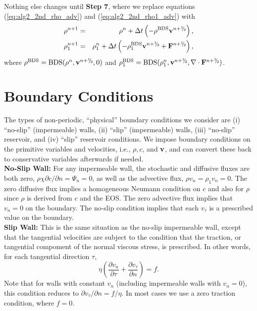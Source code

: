 \documentclass[final]{siamltex}
\newcommand{\sfrac}[2]{\mathchoice
  {\kern0em\raise.5ex\hbox{\the\scriptfont0 #1}\kern-.15em/
   \kern-.15em\lower.25ex\hbox{\the\scriptfont0 #2}}
  {\kern0em\raise.5ex\hbox{\the\scriptfont0 #1}\kern-.15em/
   \kern-.15em\lower.25ex\hbox{\the\scriptfont0 #2}}
  {\kern0em\raise.5ex\hbox{\the\scriptscriptfont0 #1}\kern-.2em/
   \kern-.15em\lower.25ex\hbox{\the\scriptscriptfont0 #2}}
  {#1\!/#2}}
\def\Fb {{\bf F}}
\def\vb {{\bf v}}
\def\myhalf {\sfrac{1}{2}}
\begin{document}
Nothing else changes until {\bf Step 7}, where we replace equations 
(\ref{eq:alg2_2nd_rho_adv}) and (\ref{eq:alg2_2nd_rho1_adv}) with
\begin{eqnarray}
\rho^{n+1} &=& \rho^n + \Delta t\left(-\rho^{\rm BDS}\vb^{n+\myhalf}\right),\\
\rho_1^{n+1} &=& \rho_1^n + \Delta t\left(-\rho_1^{\rm BDS}\vb^{n+\myhalf} + \Fb^{n+\myhalf}\right),
\end{eqnarray}
where $\rho^{\rm BDS} = {\rm BDS}(\rho^n,\vb^{n+\myhalf},0)$ and 
$\rho_1^{\rm BDS} = {\rm BDS}(\rho_1^n,\vb^{n+\myhalf},\nabla\cdot\Fb^{n+\myhalf})$.

\section{Boundary Conditions}
The types of non-periodic, ``physical'' boundary conditions we consider are 
(i) ``no-slip'' (impermeable) walls,
(ii) ``slip'' (impermeable) walls,
(iii) ``no-slip'' reservoir, and
(iv) ``slip'' reservoir conditions.
We impose boundary conditions on the primitive variables and velocities,
i.e., $\rho,c$, and $\vb$, and can convert these back to conservative
variables afterwards if needed.\\

{\bf No-Slip Wall:}  For any impermeable wall, the stochastic and diffusive
fluxes are both zero, $\rho\chi\partial c/\partial n = \Psi_n = 0$, as well as the 
advective flux, $\rho v_n = \rho_1 v_n = 0$.  The zero
diffusive flux implies a homogeneous Neumann condition on $c$ and also for $\rho$ since $\rho$
is derived from $c$ and the EOS.  The zero advective flux implies that $v_n=0$ on the
boundary.  The no-slip condition implies that each $v_{\tau}$ is a prescribed value
on the boundary.\\

{\bf Slip Wall:}  This is the same situation as the no-slip impermeable
wall, except that the tangential velocities are subject to the condition that the
traction, or tangential compoment of the normal viscous stress, is prescribed.
In other words, for each tangential direction $\tau$,
\begin{equation}
\eta\left(\frac{\partial v_n}{\partial\tau} + \frac{\partial v_{\tau}}{\partial n}\right) = f.\label{eq:free slip}
\end{equation}
Note that for walls with constant $v_n$ (including impermeable walls with $v_n=0$),
this condition reduces to $\partial v_{\tau}/\partial n=f/\eta$.  In most cases we
use a zero traction condition, where $f=0$.\\
\end{document}
